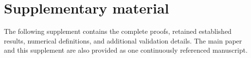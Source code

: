 \documentclass[journal,10pt,romanappendices]{IEEEtran}
\theoremstyle{definition}
\begin{document}


\clearpage
\onecolumn
\section*{Supplementary material}
\label{sec:supplement-start}
The following supplement contains the complete proofs, retained established results, numerical definitions, and additional validation details. The main paper and this supplement are also provided as one continuously referenced manuscript.
\appendices
\renewcommand{\theHsection}{Supplement.\arabic{section}}
\setcounter{theorem}{0}
\renewcommand{\thetheorem}{S\arabic{theorem}}
\renewcommand{\theHtheorem}{S\arabic{theorem}}











\end{document}
